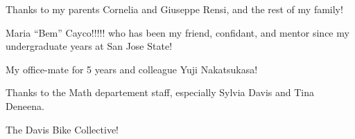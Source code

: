 
Thanks to my parents Cornelia and Giuseppe Rensi, and the rest of my family!

Maria ``Bem'' Cayco!!!!!  who has been my friend, confidant, and mentor since my undergraduate years at San Jose State!

My office-mate for 5 years and colleague Yuji Nakatsukasa!    

Thanks to the Math departement staff, especially Sylvia Davis and Tina Deneena.

The Davis Bike Collective!

